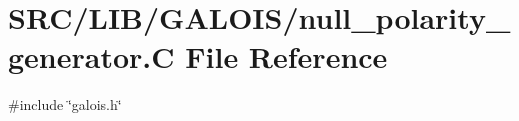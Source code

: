 \hypertarget{null__polarity__generator_8_c}{}\section{S\+R\+C/\+L\+I\+B/\+G\+A\+L\+O\+I\+S/null\+\_\+polarity\+\_\+generator.C File Reference}
\label{null__polarity__generator_8_c}
{\ttfamily \#include \char`\"{}galois.\+h\char`\"{}}\newline
